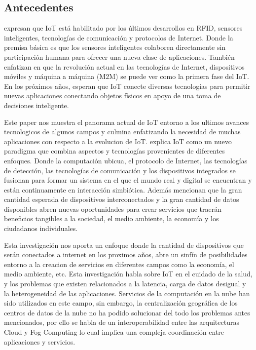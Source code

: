     \subsection{Antecedentes}
        \vskip 0.3cm
        {\bf\cite{alfuqaha2015}} expresan que IoT está habilitado por los últimos desarrollos en RFID, sensores inteligentes, tecnologías de comunicación y protocolos de Internet. Donde la premisa básica es que los sensores inteligentes colaboren directamente sin participación humana para ofrecer una nueva clase de aplicaciones. También enfatizan en que la revolución actual en las tecnologías de Internet, dispositivos móviles y máquina a máquina (M2M) se puede ver como la primera fase del IoT. En los próximos años,  esperan que IoT conecte diversas tecnologías para permitir nuevas aplicaciones conectando objetos físicos en apoyo de una toma de decisiones inteligente.\par
        Este paper nos muestra el panorama actual de IoT entorno a los ultimos avances tecnologicos de algunos campos y culmina enfatizando la necesidad de muchas aplicaciones con respecto a la evolucion de IoT.
        \vskip 0.3cm
        {\bf\cite{borgia2014}} explica IoT como un nuevo paradigma que combina aspectos y tecnologías provenientes de diferentes enfoques. Donde la computación ubicua, el protocolo de Internet, las tecnologías de detección, las tecnologías de comunicación y los dispositivos integrados se fusionan para formar un sistema en el que el mundo real y digital se encuentran y están continuamente en interacción simbiótica. Además mencionan que la gran cantidad esperada de dispositivos interconectados y la gran cantidad de datos disponibles abren nuevas oportunidades para crear servicios que traerán beneficios tangibles a la sociedad, el medio ambiente, la economía y los ciudadanos individuales.\par
        Esta investigación nos aporta un enfoque donde la cantidad de dispositivos que serán conectados a internet en los proximos años, abre un sinfín de posibilidades entorno a la creacion de servicios en diferentes campos como la economía, el medio ambiente, etc.
        \vskip 0.3cm
        {\bf\cite{mahumd2018}} Esta investigación habla sobre IoT en el cuidado de la salud, y los problemas que existen relacionados a la latencia, carga de datos desigual y la heterogeneidad de las aplicaciones. Servicios de la computación en la nube han sido utilizados en este campo, sin embargo, la centralización geográfica de los centros de datos de la nube no ha podido solucionar del todo los problemas antes mencionados, por ello se habla de un interoperabilidad entre las arquitecturas Cloud y Fog Computing lo cual implica una compleja coordinación entre aplicaciones y servicios.\par
